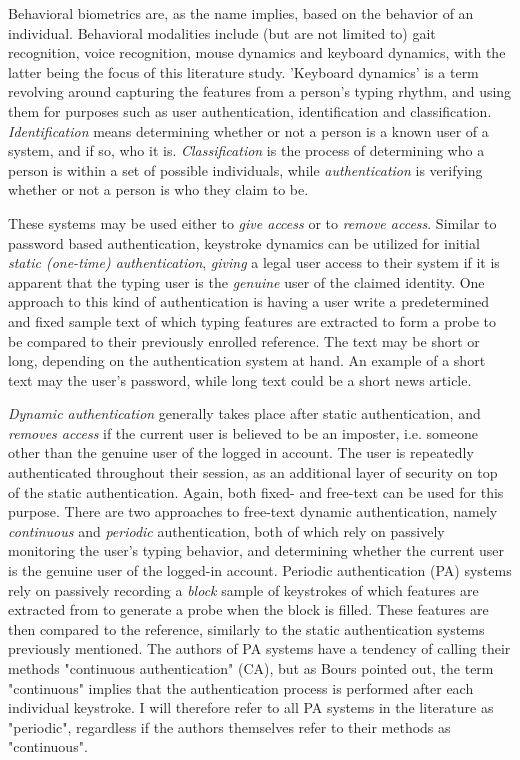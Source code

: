 \documentclass[informationsecurity]{gucmasterproject}
\begin{document}
Behavioral biometrics are, as the name implies, based on the behavior of an individual. Behavioral modalities include (but are not limited to) gait recognition, voice recognition, mouse dynamics and keyboard dynamics, with the latter being the focus of this literature study.
'Keyboard dynamics' is a term revolving around capturing the features from a person's typing rhythm, and using them for purposes such as user authentication, identification and classification.
\textit{Identification} means determining whether or not a person is a known user of a system, and if so, who it is.
\textit{Classification} is the process of determining who a person is within a set of possible individuals, while \textit{authentication} is verifying whether or not a person is who they claim to be.

These systems may be used either to \textit{give access} or to \textit{remove access}.
Similar to password based authentication, keystroke dynamics can be utilized for initial \textit{static (one-time) authentication}, \textit{giving} a legal user access to their system if it is apparent that the typing user is the \textit{genuine} user of the claimed identity.
One approach to this kind of authentication is having a user write a predetermined and fixed sample text of which typing features are extracted to form a probe to be compared to their previously enrolled reference.
The text may be short or long, depending on the authentication system at hand.  
An example of a short text may the user's password, while long text could be a short news article.

\textit{Dynamic authentication} generally takes place after static authentication, and \textit{removes access} if the current user is believed to be an imposter, i.e. someone other than the genuine user of the logged in account.
The user is repeatedly authenticated throughout their session, as an additional layer of security on top of the static authentication.
Again, both fixed- and free-text can be used for this purpose.
There are two approaches to free-text dynamic authentication, namely \textit{continuous} and \textit{periodic} authentication, both of which rely on passively monitoring the user's typing behavior, and determining whether the current user is the genuine user of the logged-in account.
Periodic authentication (PA) systems rely on passively recording a \textit{block} sample of keystrokes of which features are extracted from to generate a probe when the block is filled.
These features are then compared to the reference, similarly to the static authentication systems previously mentioned.
The authors of PA systems have a tendency of calling their methods "continuous authentication" (CA), but as Bours \cite{BOURS201236} pointed out, the term "continuous" implies that the authentication process is performed after each individual keystroke.
I will therefore refer to all PA systems in the literature as "periodic", regardless if the authors themselves refer to their methods as "continuous".
\end{document}

